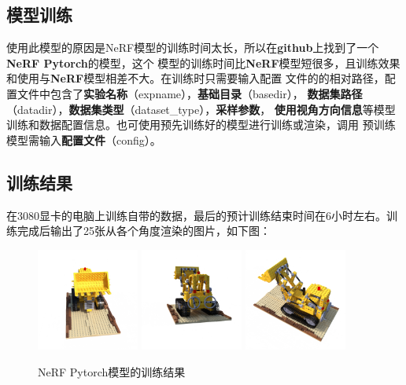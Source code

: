 \documentclass{nwputhesis}
\begin{document}
\subsection{模型训练}
使用此模型的原因是NeRF模型的训练时间太长，所以在\textbf{github}上找到了一个\textbf{NeRF Pytorch}的模型，这个
模型的训练时间比\textbf{NeRF}模型短很多，且训练效果和使用与\textbf{NeRF}模型相差不大。在训练时只需要输入配置
文件的的相对路径，配置文件中包含了\textbf{实验名称}（expname），\textbf{基础目录}（basedir），
\textbf{数据集路径}（datadir），\textbf{数据集类型}（dataset\_type），\textbf{采样参数}，
\textbf{使用视角方向信息}等模型训练和数据配置信息。也可使用预先训练好的模型进行训练或渲染，调用
预训练模型需输入\textbf{配置文件}（config）。
\subsection{训练结果}
在3080显卡的电脑上训练自带的数据，最后的预计训练结束时间在6小时左右。训练完成后输出了25张从各个角度渲染的图片，如下图：
\begin{figure}[H]
    \centering
    \includegraphics[width=0.3\textwidth]{picture/9.png}
    \includegraphics[width=0.3\textwidth]{picture/10.png}
    \includegraphics[width=0.3\textwidth]{picture/11.png}
    \caption{NeRF Pytorch模型的训练结果}
\end{figure}
\makespace
\end{document}

